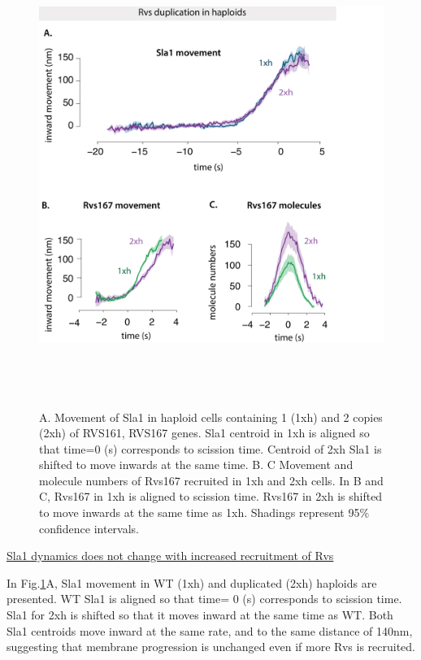 				\begin{figure}[H]
	\centering
	\includegraphics[width=15cm,height=15cm,keepaspectratio]{figures/results_final/rvs_haploid4}
	\vspace*{2mm}
	\caption[Overexpression of Rvs in haploid cells]
	{A. Movement of Sla1 in haploid cells containing 1 (1xh) and 2 copies (2xh) of RVS161, RVS167 genes. Sla1 centroid in 1xh is aligned so that time=0 (s) corresponds to scission time. Centroid of 2xh Sla1 is shifted to move inwards at the same time. 
		B. C Movement and molecule numbers of Rvs167 recruited in 1xh and 2xh cells. In B and C, Rvs167 in 1xh is aligned to scission time. Rvs167 in 2xh is shifted to move inwards at the same time as 1xh. Shadings represent 95\% confidence intervals.
		\label{fig_rvshaploid}}
	
\end{figure}
 
 \underline{Sla1 dynamics does not change with increased recruitment of Rvs}
 
In Fig.\ref{fig_rvshaploid}A, Sla1 movement in WT (1xh) and duplicated (2xh) haploids are presented. WT Sla1 is aligned so that time= 0 (s) corresponds to scission time. Sla1 for 2xh is shifted so that it moves inward at the same time as WT. Both Sla1 centroids move inward at the same rate, and to the same distance of 140nm, suggesting that membrane progression is unchanged even if more Rvs is recruited. 

